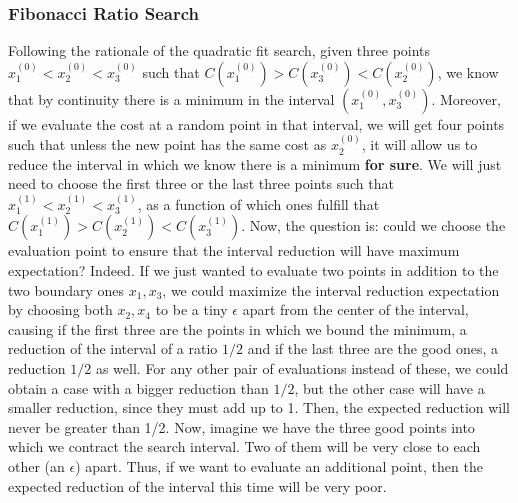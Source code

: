 \documentclass[11pt, a4paper, twoside]{article} %
\begin{document}
\vspace{-0.25cm}


\subsubsection*{Fibonacci Ratio Search}\vspace{-0.25cm}

Following the rationale of the quadratic fit search, given three points $x_1^{(0)}<x_2^{(0)}<x_3^{(0)}$ such that $C(x_1^{(0)})>C(x_3^{(0)})<C(x_2^{(0)})$, we know that by continuity there is a minimum in the interval $(x_1^{(0)},x_3^{(0)})$. Moreover, if we evaluate the cost at a random point in that interval, we will get four points such that unless the new point has the same cost as $x_2^{(0)}$, it will allow us to reduce the interval in which we know there is a minimum {\bf for sure}. We will just need to choose the first three or the last three points such that $x_1^{(1)}<x_2^{(1)}< x_3^{(1)}$, as a function of which ones fulfill that $C(x_1^{(1)})>C(x_2^{(1)})< C(x_3^{(1)})$. Now, the question is: could we choose the evaluation point to ensure that the interval reduction will have maximum expectation? Indeed. If we just wanted to evaluate two points in addition to the two boundary ones $x_1,x_3$, we could maximize the interval reduction expectation by choosing both $x_2,x_4$ to be a tiny $\epsilon$ apart from the center of the interval, causing if the first three are the points in which we bound the minimum, a reduction of the interval of a ratio $1/2$ and if the last three are the good ones, a reduction $1/2$ as well. For any other pair of evaluations instead of these, we could obtain a case with a bigger reduction than $1/2$, but the other case will have a smaller reduction, since they must add up to 1. Then, the expected reduction will never be greater than 1/2. Now, imagine we have the three good points into which we contract the search interval. Two of them will be very close to each other (an $\epsilon$) apart. Thus, if we want to evaluate an additional point, then the expected reduction of the interval this time will be very poor.
\end{document}
